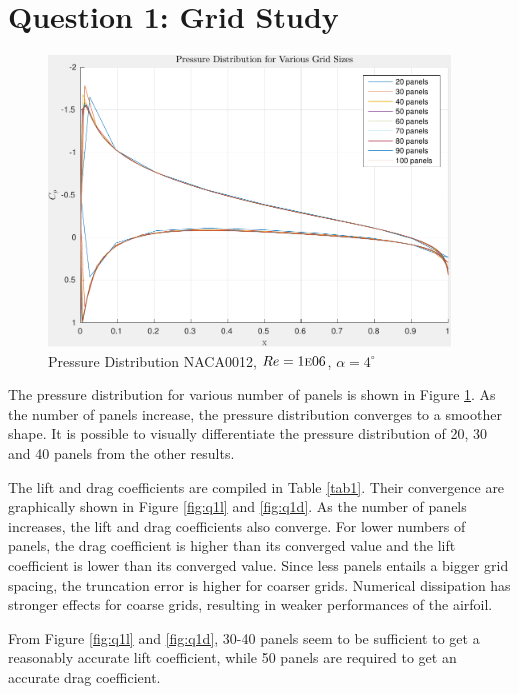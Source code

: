 \documentclass[letterpaper,12pt,]{article}
\begin{document}


\section*{Question 1: Grid Study}

\begin{figure}[!h]
    \centering
    \includegraphics[width = 0.95\textwidth]{./figures/q1pressure.pdf}
    \caption{Pressure Distribution NACA0012, $Re = 1\textsc{e}06$, $\alpha = 4^{\circ}$}
    \label{fig:q1p}
\end{figure}

The pressure distribution for various number of panels is shown in Figure \ref{fig:q1p}.
As the number of panels increase, the pressure distribution converges to a smoother shape.
It is possible to visually differentiate the pressure distribution of 20, 30 and 40 panels from the other results.

The lift and drag coefficients are compiled in Table \ref{tab1}.
Their convergence are graphically shown in Figure \ref{fig:q1l} and \ref{fig:q1d}.
As the number of panels increases, the lift and drag coefficients also converge.
For lower numbers of panels, the drag coefficient is higher than its converged value and the lift coefficient is lower than its converged value.
Since less panels entails a bigger grid spacing, the truncation error is higher for coarser grids.
Numerical dissipation has stronger effects for coarse grids, resulting in weaker performances of the airfoil.

From Figure \ref{fig:q1l} and \ref{fig:q1d}, 30-40 panels seem to be sufficient to get a reasonably accurate lift coefficient, while 50 panels are required to get an accurate drag coefficient.
\end{document}
